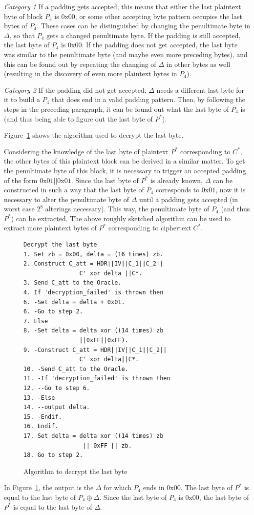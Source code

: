 \documentclass[10pt,conference,a4paper]{IEEEtran}
\begin{document}
\textit{Category 1} If a padding gets accepted, this means that either the last plaintext byte of block $P_4$ is $0\text{x}00$, or some other accepting byte pattern occupies the last bytes of $P_4$. These cases can be distinguished by changing the penultimate byte in $\Delta$, so that $P_4$ gets a changed penultimate byte. If the padding is still accepted, the last byte of $P_4$ is $0\text{x}00$. If the padding does not get accepted, the last byte was similar to the penultimate byte (and maybe even more preceding bytes), and this can be found out by repeating the changing of $\Delta$ in other bytes as well (resulting in the discovery of even more plaintext bytes in $P_4$).

\textit{Category 2} If the padding did not get accepted, $\Delta$ needs a different last byte for it to build a $P_4$ that does end in a valid padding pattern. Then, by following the steps in the preceding paragraph, it can be found out what the last byte of $P_4$ is (and thus being able to figure out the last byte of $P^{*}$).

Figure~\ref{sec:paddingoracle:padding:lastbyte} shows the algorithm used to decrypt the last byte.

Considering the knowledge of the last byte of plaintext $P^{*}$ corresponding to $C^{*}$, the other bytes of this plaintext block can be derived in a similar matter. To get the penultimate byte of this block, it is necessary to trigger an accepted padding of the form $0\text{x}01||0\text{x}01$. Since the last byte of $P^{*}$ is already known, $\Delta$ can be constructed in such a way that the last byte of $P_4$ corresponds to $0\text{x}01$, now it is necessary to alter the penultimate byte of $\Delta$ until a padding gets accepted (in worst case $2^8$ alterings necessary). This way, the penultimate byte of $P_4$ (and thus $P^{*}$) can be extracted. The above roughly sketched algorithm can be used to extract more plaintext bytes of $P^{*}$ corresponding to ciphertext $C^{*}$.

\begin{figure}
\begin{verbatim}
Decrypt the last byte
1. Set zb = 0x00, delta = (16 times) zb.
2. Construct C_att = HDR||IV||C_1||C_2||
                C' xor delta ||C*.
3. Send C_att to the Oracle.
4. If 'decryption_failed' is thrown then
6. -Set delta = delta + 0x01.
6. -Go to step 2.
7. Else
8. -Set delta = delta xor ((14 times) zb
                ||0xFF||0xFF).
9. -Construct C_att = HDR||IV||C_1||C_2||
                C' xor delta||C*.
10. -Send C_att to the Oracle.
11. -If 'decryption_failed' is thrown then
12. --Go to step 6.
13. -Else
14. --output delta.
15. -Endif.
16. Endif.
17. Set delta = delta xor ((14 times) zb
                 || 0xFF || zb.
18. Go to step 2.
\end{verbatim}
\caption{Algorithm to decrypt the last byte}
\label{sec:paddingoracle:padding:lastbyte}
\end{figure}
In Figure~\ref{sec:paddingoracle:padding:lastbyte}, the output is the $\Delta$ for which $P_4$ ends in $0\text{x}00$. The last byte of $P^{*}$ is equal to the last byte of $P_4 \oplus \Delta$. Since the last byte of $P_4$ is $0\text{x}00$, the last byte of $P^{*}$ is equal to the last byte of $\Delta$.
\end{document}
